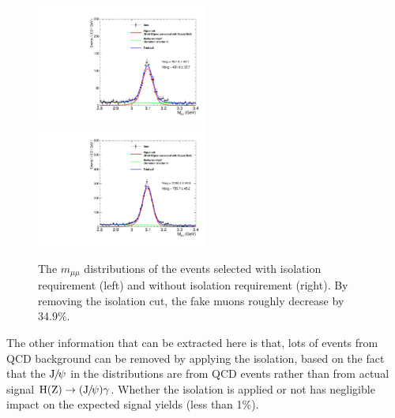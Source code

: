 	\begin{figure}[!ht]
		  \centering
		  \includegraphics[width=0.5\textwidth]{Fig/FakeMuEst/Dimuon_Nominal}~
		  \includegraphics[width=0.5\textwidth]{Fig/FakeMuEst/Dimuon_NoIso}\\
		  \caption{The $m_{\mu\mu}$ distributions of the events selected with isolation requirement (left) and without isolation requirement (right). By removing the isolation cut, the fake muons roughly decrease by 34.9\%.}
		  \label{fig:FakeMuEst}
		\end{figure}	
		
		The other information that can be extracted here is that, lots of events from QCD background can be removed by applying the isolation, based on the fact that the ${\mathrm{J}\hspace{-.08em}/\hspace{-.14em}\psi}$ in the distributions are from QCD events rather than from actual signal $\mathrm{H} (\mathrm{Z})\to({\mathrm{J}\hspace{-.08em}/\hspace{-.14em}\psi})\gamma$. Whether the isolation is applied or not has negligible impact on the expected signal yields (less than 1\%).
		

